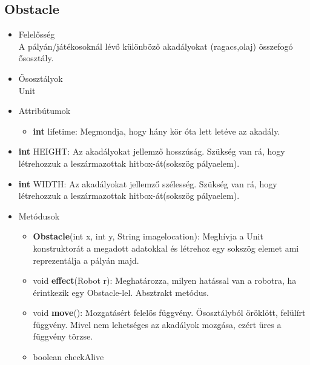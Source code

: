\subsection{Obstacle}
\begin{itemize}
\item Felelősség\\
A pályán/játékosoknál lévő különböző akadályokat (ragacs,olaj) összefogó ősosztály.
\item Ősosztályok\\
Unit
\item Attribútumok
	\begin{itemize}
		\item \textbf{int} lifetime: Megmondja, hogy hány kör óta lett letéve az akadály.
	\end{itemize}
		\item \textbf{int} HEIGHT: Az akadályokat jellemző hosszúság. Szükség van rá, hogy létrehozzuk a leszármazottak hitbox-át(sokszög pályaelem).
		\item \textbf{int} WIDTH: Az akadályokat jellemző szélesség. Szükség van rá, hogy létrehozzuk a leszármazottak hitbox-át(sokszög pályaelem).
		
\item Metódusok
	\begin{itemize}
		\item \textbf{Obstacle}(int x, int y, String imagelocation): Meghívja a Unit konstruktorát a megadott adatokkal és létrehoz egy sokszög elemet ami reprezentálja a pályán majd.
		\item void \textbf{effect}(Robot r): Meghatározza, milyen hatással van a robotra, ha érintkezik egy Obstacle-lel. Absztrakt metódus.
		\item void \textbf{move}(): Mozgatásért felelős függvény. Ősosztályból öröklött, felülírt függvény. Mivel nem lehetséges az akadályok mozgása, ezért üres a függvény törzse.
		\item boolean checkAlive 
	\end{itemize}
\end{itemize}

